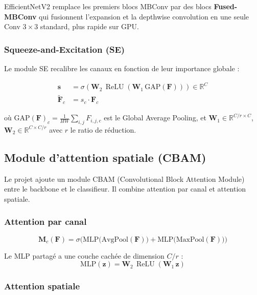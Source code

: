 \documentclass[11pt,a4paper]{article}
\newcommand{\R}{\mathbb{R}}
\DeclareMathOperator{\ReLU}{ReLU}
\begin{document}
EfficientNetV2 remplace les premiers blocs MBConv par des blocs \textbf{Fused-MBConv} qui fusionnent l'expansion et la depthwise convolution en une seule Conv $3 \times 3$ standard, plus rapide sur GPU.

\subsubsection{Squeeze-and-Excitation (SE)}

Le module SE recalibre les canaux en fonction de leur importance globale :

\begin{align}
  \mathbf{s} &= \sigma\!\left(\mathbf{W}_2\,\ReLU\!\left(\mathbf{W}_1\,\text{GAP}(\mathbf{F})\right)\right) \in \R^{C} \\[4pt]
  \widetilde{\mathbf{F}}_c &= s_c \cdot \mathbf{F}_c
\end{align}

où $\text{GAP}(\mathbf{F})_c = \frac{1}{HW}\sum_{i,j} F_{i,j,c}$ est le Global Average Pooling, et $\mathbf{W}_1 \in \R^{C/r \times C}$, $\mathbf{W}_2 \in \R^{C \times C/r}$ avec $r$ le ratio de réduction.

\subsection{Module d'attention spatiale (CBAM)}

Le projet ajoute un module CBAM (Convolutional Block Attention Module) entre le backbone et le classifieur. Il combine attention par canal et attention spatiale.

\subsubsection{Attention par canal}

\begin{equation}
  \mathbf{M}_c(\mathbf{F}) = \sigma\!\Big(\text{MLP}\big(\text{AvgPool}(\mathbf{F})\big) + \text{MLP}\big(\text{MaxPool}(\mathbf{F})\big)\Big)
\end{equation}

Le MLP partagé a une couche cachée de dimension $C/r$ :
\begin{equation}
  \text{MLP}(\mathbf{z}) = \mathbf{W}_2\,\ReLU(\mathbf{W}_1\,\mathbf{z})
\end{equation}

\subsubsection{Attention spatiale}
\end{document}
